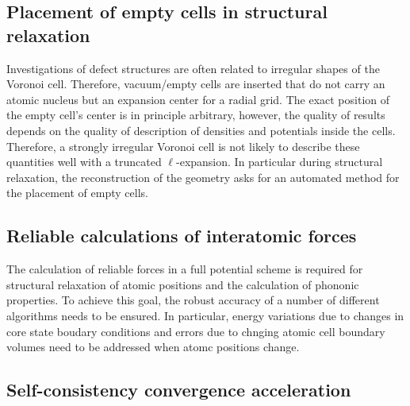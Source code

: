 \documentclass{llncs}
\begin{document}
\subsection{Placement of empty cells in structural relaxation} %

Investigations of defect structures are often related to irregular
shapes of the Voronoi cell. Therefore, vacuum/empty cells are inserted that do not carry an atomic nucleus
but an expansion center for a radial grid.
The exact position of the empty cell's center is in principle arbitrary, however, the quality of results
depends on the quality of description of densities and potentials inside the cells. Therefore,
a strongly irregular Voronoi cell is not likely to describe these quantities well with a truncated $\ell$-expansion.
In particular during structural relaxation, the reconstruction of the geometry
asks for an automated method for the placement of empty cells.

\subsection{Reliable calculations of interatomic forces} %

The calculation of reliable forces in a full potential scheme is
required for structural relaxation of atomic positions and the
calculation of phononic properties. To achieve this goal, the robust  accuracy
of a number of different algorithms needs to be ensured. In
particular, energy variations due to changes in core state  boudary
conditions and errors due to chnging atomic cell boundary
volumes need to be addressed when atomc positions change.

\subsection{Self-consistency convergence acceleration} %
\end{document}
